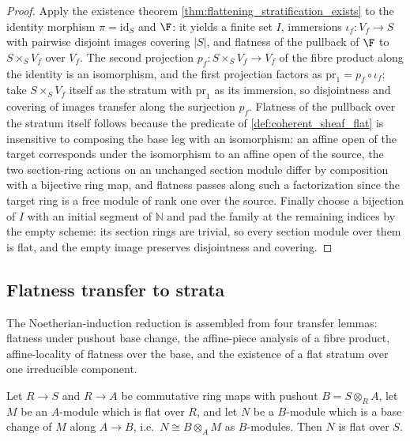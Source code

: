 \begin{proof}
  \leanok
  Apply the existence theorem \cref{thm:flattening_stratification_exists} to
  the identity morphism \(\pi = \mathrm{id}_S\) and \(\F\): it yields a
  finite set \(I\), immersions \(\iota_f : V_f \to S\) with pairwise
  disjoint images covering \(|S|\), and flatness of the pullback of \(\F\)
  to \(S \times_S V_f\) over \(V_f\).  The second projection
  \(p_f : S \times_S V_f \to V_f\) of the fibre product along the identity
  is an isomorphism, and the first projection factors as
  \(\mathrm{pr}_1 = p_f \circ \iota_f\); take \(S \times_S V_f\) itself
  as the stratum with \(\mathrm{pr}_1\) as its immersion, so disjointness
  and covering of images transfer along the surjection \(p_f\).  Flatness of
  the pullback over the stratum itself follows because the predicate of
  \cref{def:coherent_sheaf_flat} is insensitive to composing the base leg
  with an isomorphism: an affine open of the target corresponds under the
  isomorphism to an affine open of the source, the two section-ring actions
  on an unchanged section module differ by composition with a bijective ring
  map, and flatness passes along such a factorization since the target ring
  is a free module of rank one over the source.  Finally choose a bijection
  of \(I\) with an initial segment of \(\mathbb{N}\) and pad the family at
  the remaining indices by the empty scheme: its section rings are trivial,
  so every section module over them is flat, and the empty image preserves
  disjointness and covering.
\end{proof}

\subsection{Flatness transfer to strata}
\label{subsec:flat_transfer_strata}

The Noetherian-induction reduction is assembled from four transfer lemmas:
flatness under pushout base change, the affine-piece analysis of a fibre
product, affine-locality of flatness over the base, and the existence of a
flat stratum over one irreducible component.

\begin{lemma}

  \leanok
  \label{lem:flat_pushout_base_change}
  Let \(R \to S\) and \(R \to A\) be commutative ring maps with pushout
  \(B = S \otimes_R A\), let \(M\) be an \(A\)-module which is flat over
  \(R\), and let \(N\) be a \(B\)-module which is a base change of \(M\)
  along \(A \to B\), i.e.\ \(N \cong B \otimes_A M\) as \(B\)-modules.  Then
  \(N\) is flat over \(S\).
\end{lemma}

